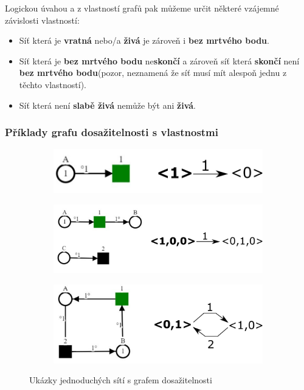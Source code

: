 \documentclass[
  biblatex,
  glossaries,
  printversion
]{kidiplom}
\begin{document}
Logickou úvahou a z vlastností grafů pak můžeme určit některé vzájemné
 závislosti vlastností:
\begin{itemize}
  \item Síť která je \textbf{vratná} nebo/a \textbf{živá} je zároveň i \textbf{bez mrtvého bodu}.
  \item Síť která je \textbf{bez mrtvého bodu} ne\textbf{skončí} a zároveň síť která \textbf{skončí} není \textbf{bez mrtvého bodu}(pozor, neznamená že síť musí mít alespoň jednu z těchto vlastností). 
  \item Síť která není \textbf{slabě živá} nemůže být ani \textbf{živá}.
\end{itemize}

\clearpage
\subsubsection{Příklady grafu dosažitelnosti s vlastnostmi}\label{příklady sítí}

\begin{figure}[h!]
  \centering
  \begin{subfigure}[h]{\linewidth}
    \centering
    \includegraphics{net_props_01}
    \caption{}\label{fig:ukázka grafu dosažitelnosti 1}
  \end{subfigure}
  
  \begin{subfigure}[h]{\linewidth}
    \includegraphics[width=\linewidth]{net_props_02}
    \caption{}\label{fig:ukázka grafu dosažitelnosti 2}
  \end{subfigure}
  
  \begin{subfigure}[h]{\linewidth}
    \includegraphics[width=\linewidth]{net_props_03}
    \caption{}\label{fig:ukázka grafu dosažitelnosti 3}
  \end{subfigure}
  \caption{Ukázky jednoduchých sítí s grafem dosažitelnosti}\label{fig: ukázky jednoduchých sítí}
\end{figure}
\end{document}
